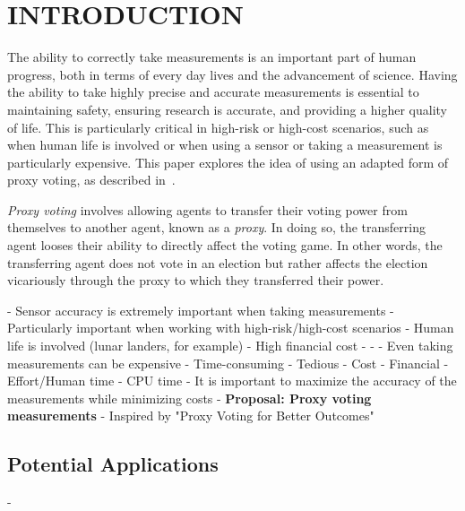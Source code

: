 %
%

\chapter{INTRODUCTION}\label{ch:introduction}
\thispagestyle{empty}

The ability to correctly take measurements is an important part of human
progress, both in terms of every day lives and the advancement of science.
Having the ability to take highly precise and accurate measurements is essential
to maintaining safety, ensuring research is accurate, and providing a higher
quality of life.
This is particularly critical in high-risk or high-cost scenarios, such as when
human life is involved or when using a sensor or taking a measurement is
particularly expensive.  %
This paper explores the idea of using an adapted form of proxy voting, as
described in~\cite{Cohensius2017}.

\textit{Proxy voting} involves allowing agents to transfer their voting power
from themselves to another agent, known as a \textit{proxy}\cite[para. 1.4]
{Cohensius2017}.
In doing so, the transferring agent looses their ability to directly affect the
voting game.
In other words, the transferring agent does not vote in an election but rather
affects the election vicariously through the proxy to which they transferred
their power.





- Sensor accuracy is extremely important when taking measurements
- Particularly important when working with high-risk/high-cost scenarios
    - Human life is involved (lunar landers, for example)
    - High financial cost
    - %
    - %
- Even taking measurements can be expensive
    - Time-consuming
    - Tedious
    - Cost
        - Financial
        - Effort/Human time
        - CPU time
- It is important to maximize the accuracy of the measurements while minimizing
  costs
    - \textbf{Proposal: Proxy voting measurements}
        - Inspired by "Proxy Voting for Better Outcomes"\cite{Cohensius2017}

\section{Potential Applications}\label{sec:potential-applications}
- %

